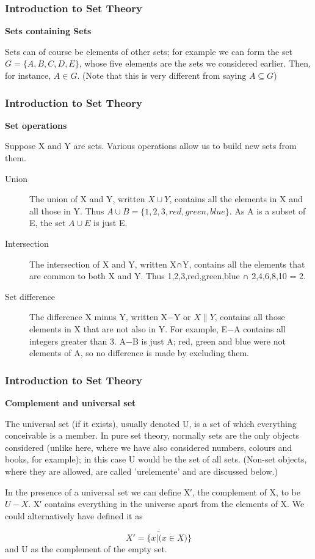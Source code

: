 \documentclass[12pt]{article}
\begin{document}
\begin{frame}
	\frametitle{Introduction to Set Theory}
	\large
\textbf{Sets containing Sets}


Sets can of course be elements of other sets; for example we can form the set $G = \{A,B,C,D,E\}$, whose five elements are the sets we considered earlier. Then, for instance, $A\in G$. (Note that this is very different from saying $A\subseteq G$)

\end{frame}
\begin{frame}
	\frametitle{Introduction to Set Theory}
	\large
\textbf{Set operations}

Suppose X and Y are sets. Various operations allow us to build new sets from them.

\begin{description}
\item[Union]
The union of X and Y, written $X\cup Y$, contains all the elements in X and all those in Y. Thus $A \cup B = \{1, 2, 3, red, green, blue\}$. As A is a subset of E, the set $A \cup E$ is just E.

\item[Intersection]

The intersection of X and Y, written X∩Y, contains all the elements that are common to both X and Y. Thus {1,2,3,red,green,blue} ∩ {2,4,6,8,10} = {2}.

\item[Set difference]

The difference X minus Y, written X−Y or $X\|Y$, contains all those elements in X that are not also in Y. For example, E−A contains all integers greater than 3. A−B is just A; red, green and blue were not elements of A, so no difference is made by excluding them.
\end{description}
\end{frame}
\begin{frame}
	\frametitle{Introduction to Set Theory}
	\large
\textbf{Complement and universal set}

The universal set (if it exists), usually denoted U, is a set of which everything conceivable is a member. In pure set theory, normally sets are the only objects considered (unlike here, where we have also considered numbers, colours and books, for example); in this case U would be the set of all sets. (Non-set objects, where they are allowed, are called 'urelemente' and are discussed below.)

In the presence of a universal set we can define X′, the complement of X, to be $U−X$. X′ contains everything in the universe apart from the elements of X. We could alternatively have defined it as

\[X′ = \{x | \tilde (x\in X)\}\]
and U as the complement of the empty set.
\end{frame}
\end{document}
